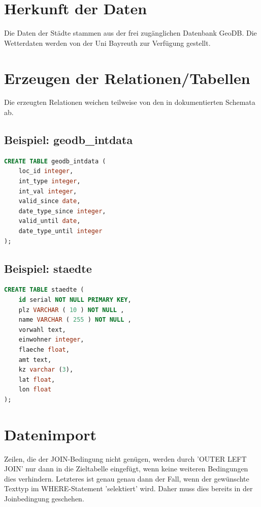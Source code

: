 \documentclass[11pt,a4paper,DIV=10,]{scrartcl}
\begin{document}
\section{Herkunft der Daten}
Die Daten der Städte stammen aus der frei zugänglichen Datenbank GeoDB. Die Wetterdaten werden von der Uni Bayreuth zur Verfügung gestellt. 
\section{Erzeugen der Relationen/Tabellen}
Die erzeugten Relationen weichen teilweise von den in \citep{geodb.org} dokumentierten Schemata ab. 
\subsection*{Beispiel: geodb\_intdata}
\begin{lstlisting}[language=sql]
CREATE TABLE geodb_intdata (
    loc_id integer,
    int_type integer,
    int_val integer,
    valid_since date,
    date_type_since integer,
    valid_until date,
    date_type_until integer
);
\end{lstlisting}
\subsection*{Beispiel: staedte}
\begin{lstlisting}[language=sql]
CREATE TABLE staedte (
	id serial NOT NULL PRIMARY KEY,
	plz VARCHAR ( 10 ) NOT NULL ,
	name VARCHAR ( 255 ) NOT NULL ,
	vorwahl text,	
	einwohner integer,
	flaeche float,
	amt text, 
	kz varchar (3),
	lat float,
	lon float
);
\end{lstlisting}
\section{Datenimport}
Zeilen, die der JOIN-Bedingung nicht genügen, werden durch 'OUTER LEFT JOIN' nur dann in die Zieltabelle eingefügt, wenn keine weiteren Bedingungen dies verhindern. Letzteres ist genau  genau dann der Fall, wenn der gewünschte Texttyp im WHERE-Statement 'selektiert' wird. Daher muss dies bereits in der Joinbedingung geschehen.
\end{document}
